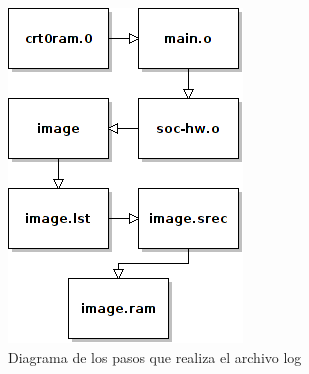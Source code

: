 \documentclass[twocolumn]{IEEEtran}
\begin{document}
\begin{figure}[H]
	\centering
		\includegraphics[scale=0.7]{UML.png}
	\caption{Diagrama de los pasos que realiza el archivo log}
	\label{fig1}
\end{figure}
\end{document}
